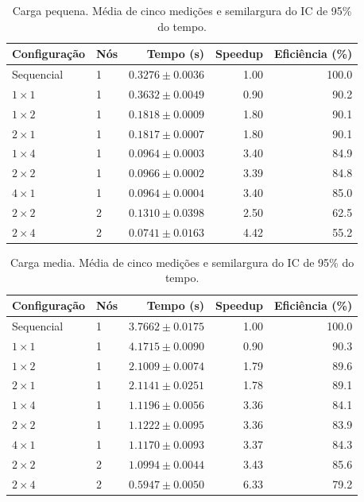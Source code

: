 \begin{table}[htbp]
\centering
\caption{Carga pequena. Média de cinco medições e semilargura do IC de 95\% do tempo.}
\label{tab:lasdpc-pequena}
\begin{tabular}{llrrr}
\toprule
Configuração & Nós & Tempo (s) & Speedup & Eficiência (\%) \\
\midrule
Sequencial & 1 & $0.3276 \pm 0.0036$ & 1.00 & 100.0 \\
$1 \times 1$ & 1 & $0.3632 \pm 0.0049$ & 0.90 & 90.2 \\
$1 \times 2$ & 1 & $0.1818 \pm 0.0009$ & 1.80 & 90.1 \\
$2 \times 1$ & 1 & $0.1817 \pm 0.0007$ & 1.80 & 90.1 \\
$1 \times 4$ & 1 & $0.0964 \pm 0.0003$ & 3.40 & 84.9 \\
$2 \times 2$ & 1 & $0.0966 \pm 0.0002$ & 3.39 & 84.8 \\
$4 \times 1$ & 1 & $0.0964 \pm 0.0004$ & 3.40 & 85.0 \\
$2 \times 2$ & 2 & $0.1310 \pm 0.0398$ & 2.50 & 62.5 \\
$2 \times 4$ & 2 & $0.0741 \pm 0.0163$ & 4.42 & 55.2 \\
\bottomrule
\end{tabular}
\end{table}

\begin{table}[htbp]
\centering
\caption{Carga media. Média de cinco medições e semilargura do IC de 95\% do tempo.}
\label{tab:lasdpc-media}
\begin{tabular}{llrrr}
\toprule
Configuração & Nós & Tempo (s) & Speedup & Eficiência (\%) \\
\midrule
Sequencial & 1 & $3.7662 \pm 0.0175$ & 1.00 & 100.0 \\
$1 \times 1$ & 1 & $4.1715 \pm 0.0090$ & 0.90 & 90.3 \\
$1 \times 2$ & 1 & $2.1009 \pm 0.0074$ & 1.79 & 89.6 \\
$2 \times 1$ & 1 & $2.1141 \pm 0.0251$ & 1.78 & 89.1 \\
$1 \times 4$ & 1 & $1.1196 \pm 0.0056$ & 3.36 & 84.1 \\
$2 \times 2$ & 1 & $1.1222 \pm 0.0095$ & 3.36 & 83.9 \\
$4 \times 1$ & 1 & $1.1170 \pm 0.0093$ & 3.37 & 84.3 \\
$2 \times 2$ & 2 & $1.0994 \pm 0.0044$ & 3.43 & 85.6 \\
$2 \times 4$ & 2 & $0.5947 \pm 0.0050$ & 6.33 & 79.2 \\
\bottomrule
\end{tabular}
\end{table}

